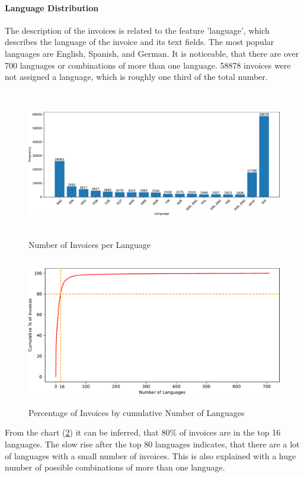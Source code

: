 \paragraph{Language Distribution}
The description of the invoices is related to the feature 'language', which describes the language of the invoice and its text fields. The most popular languages are English, Spanish, and German. It is noticeable, that there are over 700 languages or combinations of more than one language. 58878 invoices were not assigned a language, which is roughly one third of the total number.
\begin{figure}[h!]
	\centering
	\includegraphics[height=6.5cm]{Bilder/languages.pdf}
	\caption{Number of Invoices per Language}
	\label{fig:languages-bar}
\end{figure}

\begin{figure}[h!]
	\centering
	\includegraphics[height=6.5cm]{Bilder/languages_pareto.pdf}
	\caption{Percentage of Invoices by cumulative Number of Languages}
	\label{fig:languages-pareto}
\end{figure}


From the chart (\ref{fig:languages-pareto}) it can be inferred, that 80\% of invoices are in the top 16 languages. The slow rise after the top 80 languages indicates, that there are a lot of languages with a small number of invoices. This is also explained with a huge number of possible combinations of more than one language.


